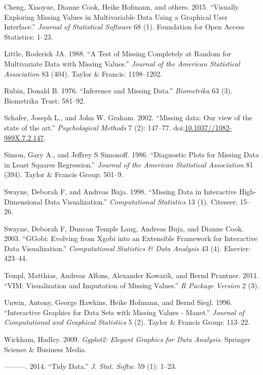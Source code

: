 \documentclass[]{article}
\begin{document}
\hypertarget{refs}{}
\hypertarget{ref-cheng2015}{}
Cheng, Xiaoyue, Dianne Cook, Heike Hofmann, and others. 2015. ``Visually
Exploring Missing Values in Multivariable Data Using a Graphical User
Interface.'' \emph{Journal of Statistical Software} 68 (1). Foundation
for Open Access Statistics: 1--23.

\hypertarget{ref-Little1988}{}
Little, Roderick JA. 1988. ``A Test of Missing Completely at Random for
Multivariate Data with Missing Values.'' \emph{Journal of the American
Statistical Association} 83 (404). Taylor \& Francis: 1198--1202.

\hypertarget{ref-Rubin1976}{}
Rubin, Donald B. 1976. ``Inference and Missing Data.'' \emph{Biometrika}
63 (3). Biometrika Trust: 581--92.

\hypertarget{ref-Schafer2002}{}
Schafer, Joseph L., and John W. Graham. 2002. ``Missing data: Our view
of the state of the art.'' \emph{Psychological Methods} 7 (2): 147--77.
doi:\href{https://doi.org/10.1037//1082-989X.7.2.147}{10.1037//1082-989X.7.2.147}.

\hypertarget{ref-simon-simonoff}{}
Simon, Gary A., and Jeffrey S Simonoff. 1986. ``Diagnostic Plots for
Missing Data in Least Squares Regression.'' \emph{Journal of the
American Statistical Association} 81 (394). Taylor \& Francis Group:
501--9.

\hypertarget{ref-Swayne1998}{}
Swayne, Deborah F, and Andreas Buja. 1998. ``Missing Data in Interactive
High-Dimensional Data Visualization.'' \emph{Computational Statistics}
13 (1). Citeseer: 15--26.

\hypertarget{ref-swayne2003ggobi}{}
Swayne, Deborah F, Duncan Temple Lang, Andreas Buja, and Dianne Cook.
2003. ``GGobi: Evolving from Xgobi into an Extensible Framework for
Interactive Data Visualization.'' \emph{Computational Statistics \& Data
Analysis} 43 (4). Elsevier: 423--44.

\hypertarget{ref-vim}{}
Templ, Matthias, Andreas Alfons, Alexander Kowarik, and Bernd Prantner.
2011. ``VIM: Visualization and Imputation of Missing Values.'' \emph{R
Package Version} 2 (3).

\hypertarget{ref-Unwin1996}{}
Unwin, Antony, George Hawkins, Heike Hofmann, and Bernd Siegl. 1996.
``Interactive Graphics for Data Sets with Missing Values - Manet.''
\emph{Journal of Computational and Graphical Statistics} 5 (2). Taylor
\& Francis Group: 113--22.

\hypertarget{ref-wickham2009ggplot2}{}
Wickham, Hadley. 2009. \emph{Ggplot2: Elegant Graphics for Data
Analysis}. Springer Science \& Business Media.

\hypertarget{ref-Wickham2014}{}
---------. 2014. ``Tidy Data.'' \emph{J. Stat. Softw.} 59 (1): 1--23.
\end{document}
